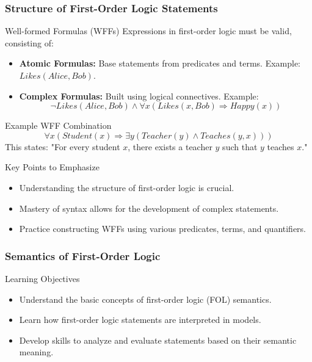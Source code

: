 \documentclass[aspectratio=169]{beamer}
\begin{document}
\begin{frame}[fragile]
    \frametitle{Structure of First-Order Logic Statements}
    \begin{block}{Well-formed Formulas (WFFs)}
        Expressions in first-order logic must be valid, consisting of:
        \begin{itemize}
            \item \textbf{Atomic Formulas:} Base statements from predicates and terms. Example: \(Likes(Alice, Bob)\).
            \item \textbf{Complex Formulas:} Built using logical connectives. Example: 
            \[
            \neg Likes(Alice, Bob) \land \forall x (Likes(x, Bob) \Rightarrow Happy(x))
            \]
        \end{itemize}
    \end{block}

    \begin{block}{Example WFF Combination}
        \[
        \forall x (Student(x) \Rightarrow \exists y (Teacher(y) \land Teaches(y, x)))
        \]
        This states: "For every student \(x\), there exists a teacher \(y\) such that \(y\) teaches \(x\)."
    \end{block}
    
    \begin{block}{Key Points to Emphasize}
        \begin{itemize}
            \item Understanding the structure of first-order logic is crucial.
            \item Mastery of syntax allows for the development of complex statements.
            \item Practice constructing WFFs using various predicates, terms, and quantifiers.
        \end{itemize}
    \end{block}
\end{frame}

\begin{frame}[fragile]
    \frametitle{Semantics of First-Order Logic}
    \begin{block}{Learning Objectives}
        \begin{itemize}
            \item Understand the basic concepts of first-order logic (FOL) semantics.
            \item Learn how first-order logic statements are interpreted in models.
            \item Develop skills to analyze and evaluate statements based on their semantic meaning.
        \end{itemize}
    \end{block}
\end{frame}
\end{document}

